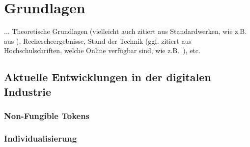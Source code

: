 \chapter{Grundlagen}
\label{cha:Grundlagen}

... Theoretische Grundlagen (vielleicht auch zitiert aus Standardwerken, wie z.B. aus \autocite{Tipler.2019}), Rechercheergebnisse, Stand der Technik  (ggf. zitiert aus Hochschulschriften, welche Online verfügbar sind, wie z.B.~\autocite{Ziegler.2017}), etc.

\section{Aktuelle Entwicklungen in der digitalen Industrie}
\subsection{Non-Fungible Tokens}
\subsection{Individualisierung}